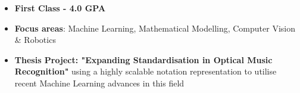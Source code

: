 \documentclass[10pt,a4paper,ragged2e,withhyper]{altacv}
\begin{document}
\begin{paracol}{2}



\begin{itemize}
    \item \textbf{First Class - 4.0 GPA}
    \item \textbf{Focus areas}: Machine Learning, Mathematical Modelling, Computer Vision \& Robotics
    \item \textbf{Thesis Project: "Expanding Standardisation in Optical Music Recognition"} using a highly scalable notation representation to utilise recent Machine Learning advances in this field
\end{itemize}

\newpage









\switchcolumn



\end{paracol}
\end{document}
